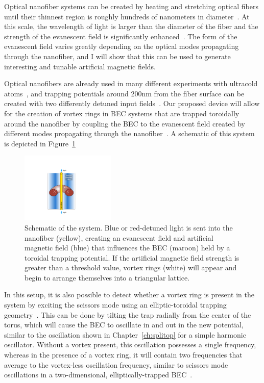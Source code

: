 Optical nanofiber systems can be created by heating and stretching optical fibers until their thinnest region is roughly hundreds of nanometers in diameter~\cite{ward2006, tong2003}.
At this scale, the wavelength of light is larger than the diameter of the fiber and the strength of the evanescent field is significantly enhanced~\cite{yariv1997}.
The form of the evanescent field varies greatly depending on the optical modes propagating through the nanofiber, and I will show that this can be used to generate interesting and tunable artificial magnetic fields.

Optical nanofibers are already used in many different experiments with ultracold atoms~\cite{vetsch2010, lacroute2012, nieddu2016, sague2007, russell2011, kumar2015}, and trapping potentials around 200nm from the fiber surface can be created with two differently detuned input fields~\cite{kien2004, phelan2013}.
Our proposed device will allow for the creation of vortex rings in BEC systems that are trapped toroidally around the nanofiber by coupling the BEC to the evanescent field created by different modes propagating through the nanofiber~\cite{sachdeva2017}.
A schematic of this system is depicted in Figure~\ref{fig:device}

\begin{figure}[t]
\begin{center}
\includegraphics[width=0.4\textwidth]{data/3d/Schematic_TB}
\end{center}
\caption{Schematic of the system. Blue or red-detuned light is sent into the nanofiber (yellow), creating an evanescent field and artificial magnetic field (blue) that influences the BEC (maroon) held by a toroidal trapping potential. If the artificial magnetic field strength is greater than a threshold value, vortex rings (white) will appear and begin to arrange themselves into a triangular lattice.}
\label{fig:device}
\end{figure}

In this setup, it is also possible to detect whether a vortex ring is present in the system by exciting the scissors mode using an elliptic-toroidal trapping geometry~\cite{cozzini2003, guery1999, marago2000}.
This can be done by tilting the trap radially from the center of the torus, which will cause the BEC to oscillate in and out in the new potential, similar to the oscillation shown in Chapter~\ref{ch:splitop} for a simple harmonic oscillator.
Without a vortex present, this oscillation possesses a single frequency, whereas in the presence of a vortex ring, it will contain two frequencies that average to the vortex-less oscillation frequency, similar to scissors mode oscillations in a two-dimensional, elliptically-trapped BEC~\cite{smith2004, zambelli1998, stringari2001}.

